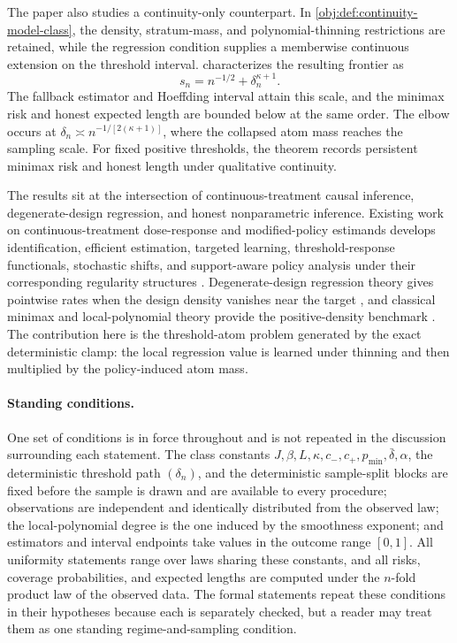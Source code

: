 \documentclass[11pt]{article}
\begin{document}
The paper also studies a continuity-only counterpart. In \cref{obj:def:continuity-model-class}, the density, stratum-mass, and polynomial-thinning restrictions are retained, while the regression condition supplies a memberwise continuous extension on the threshold interval.  characterizes the resulting frontier as
\[
s_n=n^{-1/2}+\delta_n^{\kappa+1}.
\]
The fallback estimator and Hoeffding interval attain this scale, and the minimax risk and honest expected length are bounded below at the same order. The elbow occurs at \(\delta_n\asymp n^{-1/[2(\kappa+1)]}\), where the collapsed atom mass reaches the sampling scale. For fixed positive thresholds, the theorem records persistent minimax risk and honest length under qualitative continuity.

The results sit at the intersection of continuous-treatment causal inference, degenerate-design regression, and honest nonparametric inference. Existing work on continuous-treatment dose-response and modified-policy estimands develops identification, efficient estimation, targeted learning, threshold-response functionals, stochastic shifts, and support-aware policy analysis under their corresponding regularity structures \citep{Imbens2000,Hirano2005,Imai2004,KennedyMaMcHughSmall2017,vanderLaanZhangGilbert2023,Diaz2026,Koo2026,McCoyZhangHubbardvanderLaanSchuler2026}. Degenerate-design regression theory gives pointwise rates when the design density vanishes near the target \citep{Gaiffas2005DegenerateDesign,Gaiffas2007Inhomogeneous}, and classical minimax and local-polynomial theory provide the positive-density benchmark \citep{Stone1982,Fan1996,Tsybakov2009}. The contribution here is the threshold-atom problem generated by the exact deterministic clamp: the local regression value is learned under thinning and then multiplied by the policy-induced atom mass.

\paragraph{Standing conditions.}
One set of conditions is in force throughout and is not repeated in the discussion surrounding each statement. The class constants \(J,\beta,L,\kappa,c_-,c_+,p_{\min},\bar\delta,\alpha\), the deterministic threshold path \((\delta_n)\), and the deterministic sample-split blocks are fixed before the sample is drawn and are available to every procedure; observations are independent and identically distributed from the observed law; the local-polynomial degree is the one induced by the smoothness exponent; and estimators and interval endpoints take values in the outcome range \([0,1]\). All uniformity statements range over laws sharing these constants, and all risks, coverage probabilities, and expected lengths are computed under the \(n\)-fold product law of the observed data. The formal statements repeat these conditions in their hypotheses because each is separately checked, but a reader may treat them as one standing regime-and-sampling condition.
\end{document}
